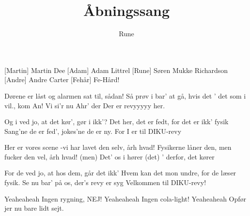 \documentclass[danish]{article}
\title{Åbningssang}
\author{Rune}
\begin{document}
\maketitle

\begin{roles}
  [Martin] Martin Dee
  [Adam] Adam Littrel
  [Rune] Søren Mukke Richardson
  [Andre] Andre Carter
  [Fehår] Fe-Hård!
\end{roles}

\begin{song}

 Dørene er låst og alarmen sat til, sådan!
Så prøv i bar' at gå, hvis det ' det som i vil., kom An!
Vi si'r nu Ahr' der
Der er revyyyyy her.

Og i ved jo, at det kør', gør i ikk'?
Det her, det er fedt, for det er ikk' fysik
Sang'ne de er fed', jokes'ne de er ny.
For I er til DIKU-revy

Her er vores scene -vi har lavet den selv, årh hvad!
Fysikerne låner den, men fucker den vel, årh hvad!
(men) Det' os i hører
(det) ' derfor, det kører

For de ved jo, at hos dem, går det ikk'
Hvem kan det mon undre, for de læser fysik.
Se nu bar' på os, der's revy er syg
Velkommen til DIKU-revy!


 Yeaheaheah
Ingen rygning, NEJ!
Yeaheaheah
Ingen cola-light!
Yeaheaheah
Opfør jer nu bare lidt sejt.

 


\end{song}
\end{document}
